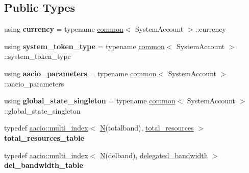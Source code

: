 \subsection*{Public Types}
\begin{DoxyCompactItemize}
\item 
\mbox{\label{classaaciosystem_1_1delegate__bandwidth_a91bad5009a172a288f17d7f20fb55a13}} 
using {\bfseries currency} = typename \mbox{\hyperlink{classaaciosystem_1_1common}{common}}$<$ System\+Account $>$\+::currency
\item 
\mbox{\label{classaaciosystem_1_1delegate__bandwidth_a67ab7ef56f3a44adc269435a7da1c6ce}} 
using {\bfseries system\+\_\+token\+\_\+type} = typename \mbox{\hyperlink{classaaciosystem_1_1common}{common}}$<$ System\+Account $>$\+::system\+\_\+token\+\_\+type
\item 
\mbox{\label{classaaciosystem_1_1delegate__bandwidth_aeb7c5f42e1bfb92e29dafb2003fca352}} 
using {\bfseries aacio\+\_\+parameters} = typename \mbox{\hyperlink{classaaciosystem_1_1common}{common}}$<$ System\+Account $>$\+::aacio\+\_\+parameters
\item 
\mbox{\label{classaaciosystem_1_1delegate__bandwidth_aed8836a7843e95b22bfd5a7dabe944cc}} 
using {\bfseries global\+\_\+state\+\_\+singleton} = typename \mbox{\hyperlink{classaaciosystem_1_1common}{common}}$<$ System\+Account $>$\+::global\+\_\+state\+\_\+singleton
\item 
\mbox{\label{classaaciosystem_1_1delegate__bandwidth_abf6c44878d66f9138e41edd07fd6af09}} 
typedef \mbox{\hyperlink{classaacio_1_1multi__index}{aacio\+::multi\+\_\+index}}$<$ \mbox{\hyperlink{group__types_gaf9c1edb0e0da55ec6ba09f32f6839529}{N}}(totalband), \mbox{\hyperlink{structaaciosystem_1_1delegate__bandwidth_1_1total__resources}{total\+\_\+resources}} $>$ {\bfseries total\+\_\+resources\+\_\+table}
\item 
\mbox{\label{classaaciosystem_1_1delegate__bandwidth_a1aca0462353e62caa1feddcb7d84b69f}} 
typedef \mbox{\hyperlink{classaacio_1_1multi__index}{aacio\+::multi\+\_\+index}}$<$ \mbox{\hyperlink{group__types_gaf9c1edb0e0da55ec6ba09f32f6839529}{N}}(delband), \mbox{\hyperlink{structaaciosystem_1_1delegate__bandwidth_1_1delegated__bandwidth}{delegated\+\_\+bandwidth}} $>$ {\bfseries del\+\_\+bandwidth\+\_\+table}

\end{DoxyCompactItemize}
